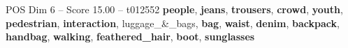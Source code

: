 \begin{textsample}{POS Dim 6 – Score 15.00 – t012552}  \label{ex:f6_pos_030}
\textbf{people}, \textbf{jeans}, \textbf{trousers}, \textbf{crowd}, \textbf{youth}, \textbf{pedestrian}, \textbf{interaction}, luggage\_\&\_bags, \textbf{bag}, \textbf{waist}, \textbf{denim}, \textbf{backpack}, \textbf{handbag}, \textbf{walking}, \textbf{feathered\_hair}, \textbf{boot}, \textbf{sunglasses}

\end{textsample}
